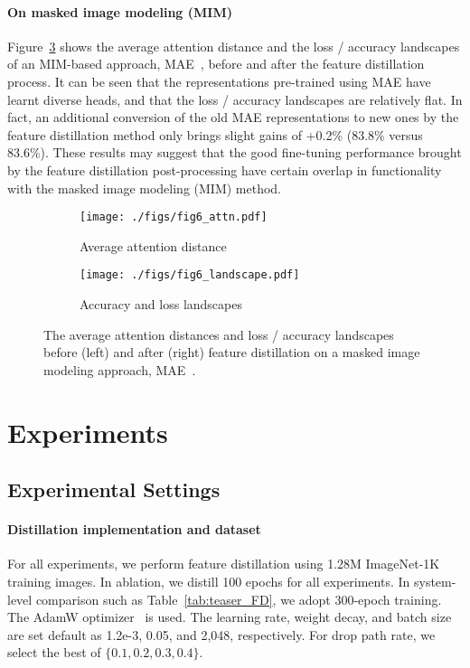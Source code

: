 \documentclass{article}
\begin{document}
\paragraph{On masked image modeling (MIM)} Figure~\ref{fig:fd_mae} shows the average attention distance and the loss / accuracy landscapes of an MIM-based approach, MAE~\cite{MaskedAutoencoders2021}, before and after the feature distillation process. It can be seen that the representations pre-trained using MAE have learnt diverse heads, and that the loss / accuracy landscapes are relatively flat. In fact, an additional conversion of the old MAE representations to new ones by the feature distillation method only brings slight gains of +0.2\% (83.8\% versus 83.6\%). These results may suggest that the good fine-tuning performance brought by the feature distillation post-processing have certain overlap in functionality with the masked image modeling (MIM) method.

\begin{figure}
\centering
\begin{subfigure}{.45\textwidth}
  \centering
  \texttt{[image: ./figs/fig6\_attn.pdf]}
  \caption{Average attention distance}
  \label{fig:fd_mae_a}
\end{subfigure}\begin{subfigure}{.55\textwidth}
  \centering
  \texttt{[image: ./figs/fig6\_landscape.pdf]}
  \caption{Accuracy and loss landscapes}
  \label{fig:fd_mae_b}
\end{subfigure}

    \caption{The average attention distances and loss / accuracy landscapes before (left) and after (right) feature distillation on a masked image modeling approach, MAE~\cite{MaskedAutoencoders2021}. }
    \label{fig:fd_mae}
\end{figure}

\section{Experiments}
\label{sec-experiment}
\subsection{Experimental Settings}

\paragraph{Distillation implementation and dataset} For all experiments, we perform feature distillation using 1.28M ImageNet-1K training images. In ablation, we distill 100 epochs for all experiments. In system-level comparison such as Table~\ref{tab:teaser_FD}, we adopt 300-epoch training. The AdamW optimizer~\cite{kingma2014adam} is used. The learning rate, weight decay, and batch size are set default as 1.2e-3, 0.05, and 2,048, respectively. For drop path rate, we select the best of $\{0.1,0.2,0.3,0.4\}$.
\end{document}
